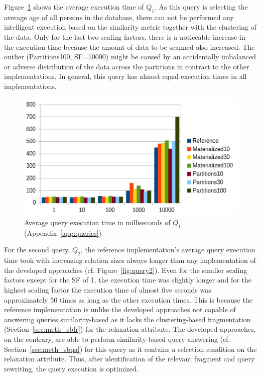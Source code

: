 Figure~\ref{fig:query1} shows the average execution time of $Q_1$. As this query is selecting the average age of all persons in the database, 
there can not be performed any intelligent execution based on the similarity metric together with the clustering of the data. Only for the last two scaling
factors, there is a noticeable increase in the execution time because the amount of data to be scanned also increased. The outlier (Partitions100, SF=10000)
might be caused by an accidentally imbalanced or adverse distribution of the data across the partitions in contrast to the other implementations. In general,
this query has almost equal execution times in all implementations.
\begin{figure}[h]
    \centering
    \includegraphics[scale=0.8]{charts/Query1.pdf}
    \caption{Average query execution time in milliseconds of $Q_1$ (Appendix~\ref{app:queries})}
    \label{fig:query1}
\end{figure}

For the second query, $Q_2$, the reference implementation's average query execution time took with increasing relation sizes always longer than any
implementation of the developed approaches (cf. Figure~\ref{fig:query2}). Even for the smaller scaling factors except for the SF of 1, the execution time was
slightly longer and for the highest scaling factor the execution time of almost five seconds was approximately 50 times as long as the other execution times.
This is because the reference implementation is unlike the developed approaches not capable of answering queries similarity-based as it lacks the
clustering-based fragmentation (Section~\ref{sec:meth_cbfr}) for the relaxation attribute. The developed approaches, on the contrary, are able to perform
similarity-based query answering (cf. Section~\ref{sec:meth_sbqa}) for this query as it contains a selection condition on the relaxation attribute. Thus, 
after identification of the relevant fragment and query rewriting, the query execution is optimized.

